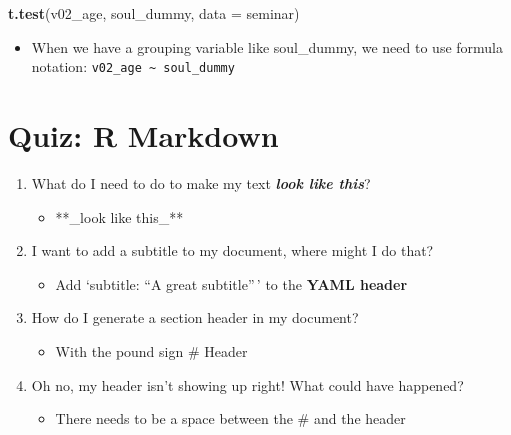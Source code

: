 \documentclass[
]{book}
\newenvironment{Shaded}{\begin{snugshade}}{\end{snugshade}}
\newcommand{\AttributeTok}[1]{\textcolor[rgb]{0.13,0.29,0.53}{#1}}
\newcommand{\FunctionTok}[1]{\textcolor[rgb]{0.13,0.29,0.53}{\textbf{#1}}}
\newcommand{\NormalTok}[1]{#1}
\providecommand{\tightlist}{%
  \setlength{\itemsep}{0pt}\setlength{\parskip}{0pt}}
\begin{document}
\begin{enumerate}
\begin{Shaded}
\begin{Highlighting}[]
\FunctionTok{t.test}\NormalTok{(v02\_age, soul\_dummy, }\AttributeTok{data =}\NormalTok{ seminar)}
\end{Highlighting}
\end{Shaded}

  \begin{itemize}
  \tightlist
  \item
    When we have a grouping variable like soul\_dummy, we need to use formula notation: \texttt{v02\_age\ \textasciitilde{}\ soul\_dummy}
  \end{itemize}
\end{enumerate}

\section{Quiz: R Markdown}\label{quiz-r-markdown}

\begin{enumerate}
\def\labelenumi{\arabic{enumi}.}
\tightlist
\item
  What do I need to do to make my text \textbf{\emph{look like this}}?

  \begin{itemize}
  \tightlist
  \item
    **\_look like this\_**
  \end{itemize}
\item
  I want to add a subtitle to my document, where might I do that?

  \begin{itemize}
  \tightlist
  \item
    Add `subtitle: ``A great subtitle''\,' to the \textbf{YAML header}
  \end{itemize}
\item
  How do I generate a section header in my document?

  \begin{itemize}
  \tightlist
  \item
    With the pound sign \# Header
  \end{itemize}
\item
  Oh no, my header isn't showing up right! What could have happened?

  \begin{itemize}
  \tightlist
  \item
    There needs to be a space between the \# and the header
  \end{itemize}
\end{enumerate}
\end{document}
